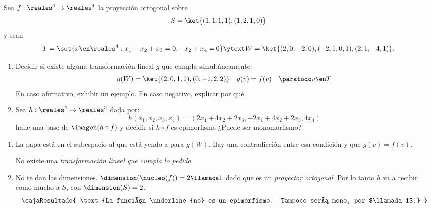 \begin{enunciado}{\ejExtra}
  Sea $f : \reales^4 \to \reales^4$
  la proyección ortogonal sobre
  $$
    S = \ket{(1,1,1,1), (1,2,1,0)}
  $$
  y sean
  $$
    T =\set{x \en \reales^4 : x_1 - x_2 + x_3 = 0, -x_2 + x_4 = 0}
    \ytext W = \ket{(2,0,-2,0), (-2,1,0,1), (2,1,-4,1)}.
  $$
\end{enunciado}

\begin{enumerate}[label=\alph*)]
  \item Decidir si existe alguna transformación lineal $g$ que cumpla simultáneamente:
        $$
          g(W) = \ket{(2,0,1,1), (0,-1,2,2)}
          \quad
          g(v) = f(v) \quad \paratodo v \en T
        $$
        En caso afirmativo, exhibir un ejemplo. En caso negativo, explicar por qué.

  \item
        Sea $h: \reales^4 \to \reales^3$ dada por:
        $$
          h(x_1, x_2, x_3, x_4) = (2x_1 + 4x_2 + 2x_3, -2x_1 + 4x_2 + 2x_3, 4x_4)
        $$
        halle una base de $\imagen(h \circ f)$ y decidir si $h \circ f$ es epimorfismo ¿Puede ser monomorfismo?
\end{enumerate}

\begin{enumerate}[label=\alph*)]
  \item La papa está en el subespacio al que está yendo a para $g(W)$. Hay una contradicción entre esa
        condición y que $g(v) = f(v)$.

        No existe una \textit{transformación lineal que cumpla lo pedido}

  \item
        No te dan las dimensiones. $\dimension(\nucleo(f)) = 2\llamada1$ dado
        que es un \textit{proyector ortogonal}.
        Por lo tanto $h$ va a recibir como mucho a $S$, con $\dimension(S) = 2$.
        $$
          \cajaResultado{
            \text{La función \underline{no} es un epimorfismo. Tampoco será mono, por $\llamada1$.}
          }
        $$
\end{enumerate}

\begin{aportes}
  \item {}
\end{aportes}
